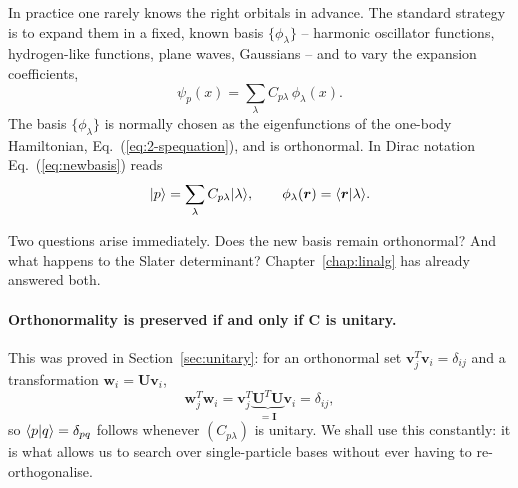 In practice one rarely knows the right orbitals in advance.  The standard
strategy is to expand them in a fixed, known basis $\{\phi_{\lambda}\}$ --
harmonic oscillator functions, hydrogen-like functions, plane waves,
Gaussians -- and to vary the expansion coefficients,
\begin{equation}
  \psi_p(x) = \sum_{\lambda} C_{p\lambda}\,\phi_{\lambda}(x).
  \label{eq:newbasis}
\end{equation}
The basis $\{\phi_{\lambda}\}$ is normally chosen as the eigenfunctions of the
one-body Hamiltonian, Eq.~(\ref{eq:2-spequation}), and is orthonormal.  In
Dirac notation Eq.~(\ref{eq:newbasis}) reads
\begin{equation}
  \vert p \rangle = \sum_{\lambda}C_{p\lambda}\vert \lambda \rangle,
  \qquad
  \phi_{\lambda}(\bm{r}) = \langle \bm{r} \vert \lambda \rangle.
  \label{eq:2-newbasisdirac}
\end{equation}

Two questions arise immediately.  Does the new basis remain orthonormal?  And
what happens to the Slater determinant?  Chapter~\ref{chap:linalg} has already
answered both.

\paragraph{Orthonormality is preserved if and only if $\bm{C}$ is unitary.}
This was proved in Section~\ref{sec:unitary}: for an orthonormal set
$\bm{v}_j^{T}\bm{v}_i=\delta_{ij}$ and a transformation
$\bm{w}_i=\bm{U}\bm{v}_i$,
\begin{equation}
  \bm{w}_j^{T}\bm{w}_i
   = \bm{v}_j^{T}\underbrace{\bm{U}^{T}\bm{U}}_{=\bm{I}}\bm{v}_i
   = \delta_{ij},
  \label{eq:2-orthopreserved}
\end{equation}
so $\langle p \vert q \rangle=\delta_{pq}$ follows whenever $(C_{p\lambda})$ is unitary.
We shall use this constantly: it is what allows us to search over
single-particle bases without ever having to re-orthogonalise.

